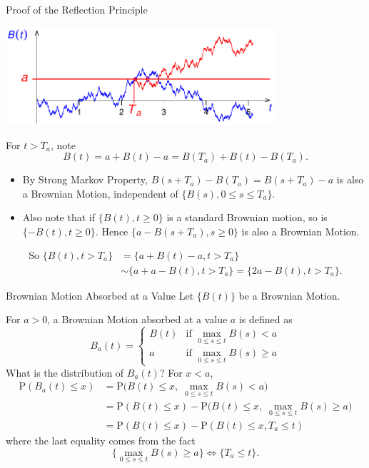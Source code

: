 \documentclass[letterpaper]{beamer}
\def\p{\mathrm P}
\begin{document}
\begin{frame}{Proof of the Reflection Principle}
\begin{flushright}
\includegraphics[width=0.75\textwidth]{Lecture22_ReflectionPrinciple2.pdf}
\end{flushright}

\vspace{-16pt}For $t>T_a$, note
$$B(t)=a+B(t)-a=B(T_a)+B(t)-B(T_a).$$\vspace{-12pt}

\begin{itemize}
\item By Strong Markov Property,
$B(s+T_a)-B(T_a)=B(s+T_a)-a$ is also a Brownian Motion, independent of $\{B(s), 0\le s\le T_{a}\}$.
\item Also note that if $\{B(t),t\ge 0\}$ is a standard Brownian motion,
so is $\{-B(t),t\ge 0\}$. Hence $\{a-B(s+T_a),s\ge 0\}$ is also a Brownian Motion.
\end{itemize}
\begin{align*}
\text{So }\{B(t),t>T_a\}&=\{a+B(t)-a,t>T_a\}\\
&\sim \{a+a-B(t),t>T_a\}=\{2a-B(t),t>T_a\}.
\end{align*}
\end{frame}
\begin{frame}{Brownian Motion Absorbed at a Value}
Let $\{B(t)\}$ be a Brownian Motion.\par
For $a> 0$, a Brownian Motion absorbed at a value $a$ is defined as
$$B_a(t)=
\begin{cases}B(t) &\text{if }\max_{0\le s\le t}B(s)< a\\
a & \text{if }\max_{0\le s\le t}B(s)\ge a
\end{cases}$$
What is the distribution of $B_a(t)$? For $x<a$,
\begin{align*}
\p(B_a(t)\le x)&=\p\Big(B(t)\le x,\; \max_{0\le s\le t}B(s)< a\Big)\\[-3pt]
&=\p(B(t)\le x)-\p\Big(B(t)\le x,\; \max_{0\le s\le t}B(s)\ge a\Big)\\[-3pt]
&=\p(B(t)\le x)-\p(B(t)\le x, T_a\le t)
\end{align*}
where the last equality comes from the fact
$$\Big\{\max_{0\le s\le t}B(s)\ge a\Big\}\Leftrightarrow\{T_a\le t\}.$$
\end{frame}
\end{document}
